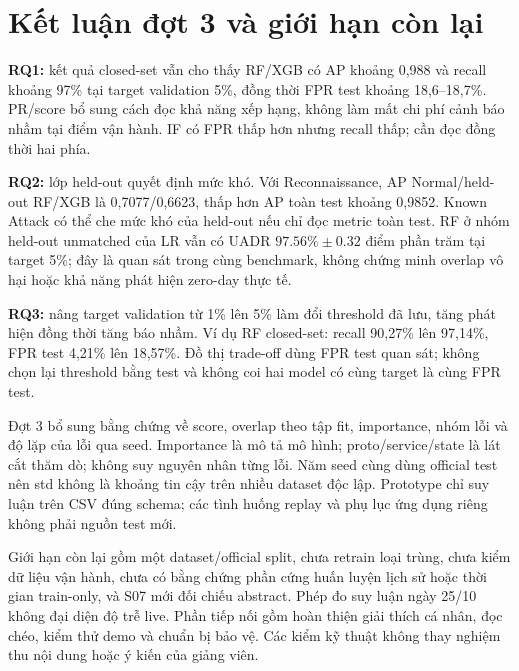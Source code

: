\section{Kết luận đợt 3 và giới hạn còn lại}
\textbf{RQ1:} kết quả closed-set vẫn cho thấy RF/XGB có AP khoảng 0,988 và recall khoảng 97\% tại target validation 5\%, đồng thời FPR test khoảng 18,6--18,7\%. PR/score bổ sung cách đọc khả năng xếp hạng, không làm mất chi phí cảnh báo nhầm tại điểm vận hành. IF có FPR thấp hơn nhưng recall thấp; cần đọc đồng thời hai phía.

\textbf{RQ2:} lớp held-out quyết định mức khó. Với Reconnaissance, AP Normal/held-out RF/XGB là 0,7077/0,6623, thấp hơn AP toàn test khoảng 0,9852. Known Attack có thể che mức khó của held-out nếu chỉ đọc metric toàn test. RF ở nhóm held-out unmatched của LR vẫn có UADR $97.56\%\pm0.32$ điểm phần trăm tại target 5\%; đây là quan sát trong cùng benchmark, không chứng minh overlap vô hại hoặc khả năng phát hiện zero-day thực tế.

\textbf{RQ3:} nâng target validation từ 1\% lên 5\% làm đổi threshold đã lưu, tăng phát hiện đồng thời tăng báo nhầm. Ví dụ RF closed-set: recall 90,27\% lên 97,14\%, FPR test 4,21\% lên 18,57\%. Đồ thị trade-off dùng FPR test quan sát; không chọn lại threshold bằng test và không coi hai model có cùng target là cùng FPR test.

Đợt 3 bổ sung bằng chứng về score, overlap theo tập fit, importance, nhóm lỗi và độ lặp của lỗi qua seed. Importance là mô tả mô hình; proto/service/state là lát cắt thăm dò; không suy nguyên nhân từng lỗi. Năm seed cùng dùng official test nên std không là khoảng tin cậy trên nhiều dataset độc lập. Prototype chỉ suy luận trên CSV đúng schema; các tình huống replay và phụ lục ứng dụng riêng không phải nguồn test mới.

Giới hạn còn lại gồm một dataset/official split, chưa retrain loại trùng, chưa kiểm dữ liệu vận hành, chưa có bằng chứng phần cứng huấn luyện lịch sử hoặc thời gian train-only, và S07 mới đối chiếu abstract. Phép đo suy luận ngày 25/10 không đại diện độ trễ live. Phần tiếp nối gồm hoàn thiện giải thích cá nhân, đọc chéo, kiểm thử demo và chuẩn bị bảo vệ. Các kiểm kỹ thuật không thay nghiệm thu nội dung hoặc ý kiến của giảng viên.
